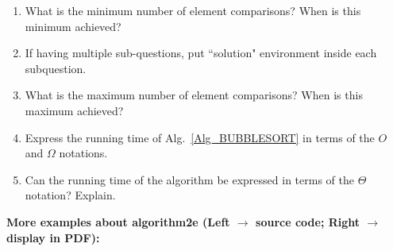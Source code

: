 \documentclass[12pt,a4paper]{article}
\makeatletter
\newtheorem*{solution}{Solution}
\theoremstyle{definition}
\renewenvironment{solution}[1][Solution] {\par\pushQED{\qed}\normalfont\topsep6\p@\@plus6\p@\relax\trivlist\item[\hskip\labelsep\bfseries#1\@addpunct{.}]\ignorespaces}{\popQED\endtrivlist\@endpefalse} \makeatother
\makeatother
\begin{document}
\begin{enumerate}
\begin{minipage}[t]{0.9\textwidth}
\begin{algorithm}[H]
\end{algorithm}
\end{minipage}
\hspace{2mm}

\begin{enumerate}
	\item What is the minimum number of element comparisons? When is this minimum achieved?
    \begin{solution}
        If having multiple sub-questions, put ``solution" environment inside each subquestion.
    \end{solution}
	
	\item What is the maximum number of element comparisons? When is this maximum achieved?
	
	\item Express the running time of Alg.~\ref{Alg_BUBBLESORT} in terms of the $O$ and $\Omega$ notations.
	
	\item Can the running time of the algorithm be expressed in terms of the
	$\Theta$ notation? Explain.
\end{enumerate}
\end{enumerate}

{\color{purple}\textbf{More examples about algorithm2e (Left $\rightarrow$ source code; Right $\rightarrow$ display in PDF):}}
\end{document}
